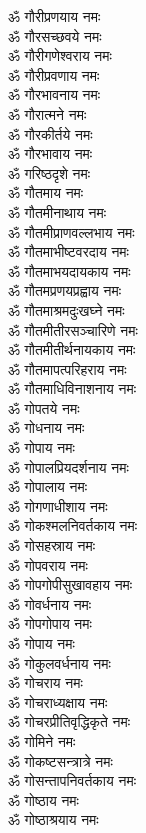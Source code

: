\begin{multicols}{2}
\begin{flushleft}
ॐ गौरीप्रणयाय नमः\hfill{}\\
ॐ गौरसच्छवये नमः\\
ॐ गौरीगणेश्वराय नमः\\
ॐ गौरीप्रवणाय नमः\\
ॐ गौरभावनाय नमः\\
ॐ गौरात्मने नमः\\
ॐ गौरकीर्तये नमः\\
ॐ गौरभावाय नमः\\
ॐ गरिष्ठदृशे नमः\\
ॐ गौतमाय नमः\\
ॐ गौतमीनाथाय नमः\hfill{}\\
ॐ गौतमीप्राणवल्लभाय नमः\\
ॐ गौतमाभीष्टवरदाय नमः\\
ॐ गौतमाभयदायकाय नमः\\
ॐ गौतमप्रणयप्रह्वाय नमः\\
ॐ गौतमाश्रमदुःखघ्ने नमः\\
ॐ गौतमीतीरसञ्चारिणे नमः\\
ॐ गौतमीतीर्थनायकाय नमः\\
ॐ गौतमापत्परिहराय नमः\\
ॐ गौतमाधिविनाशनाय नमः\\
ॐ गोपतये नमः\hfill{}\\
ॐ गोधनाय नमः\\
ॐ गोपाय नमः\\
ॐ गोपालप्रियदर्शनाय नमः\\
ॐ गोपालाय नमः\\
ॐ गोगणाधीशाय नमः\\
ॐ गोकश्मलनिवर्तकाय नमः\\
ॐ गोसहस्राय नमः\\
ॐ गोपवराय नमः\\
ॐ गोपगोपीसुखावहाय नमः\\
ॐ गोवर्धनाय नमः\hfill{}\\
ॐ गोपगोपाय नमः\\
ॐ गोपाय नमः\\
ॐ गोकुलवर्धनाय नमः\\
ॐ गोचराय नमः\\
ॐ गोचराध्यक्षाय नमः\\
ॐ गोचरप्रीतिवृद्धिकृते नमः\\
ॐ गोमिने नमः\\
ॐ गोकष्टसन्त्रात्रे नमः\\
ॐ गोसन्तापनिवर्तकाय नमः\\
ॐ गोष्ठाय नमः\hfill{}\\
ॐ गोष्ठाश्रयाय नमः\\

\end{flushleft}
\end{multicols}
